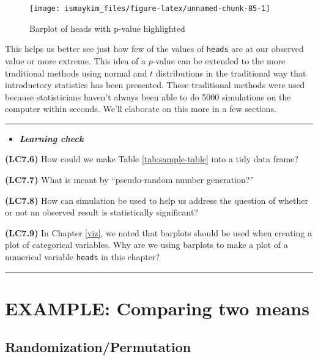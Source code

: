 \documentclass[]{tufte-book}
\let\oldrule=\rule
\renewcommand{\rule}[1]{\oldrule{\linewidth}}
\newenvironment{rmdblock}[1]
  {\begin{shaded*}
  \begin{itemize}
  \renewcommand{\labelitemi}{
    \raisebox{-.7\height}[0pt][0pt]{
    }
  }
  \item
  }
  {
  \end{itemize}
  \end{shaded*}
  }
\newenvironment{learncheck}
  {\begin{rmdblock}{warning}}
  {\end{rmdblock}}
\theoremstyle{definition}
\theoremstyle{definition}
\theoremstyle{remark}
\begin{document}
\begin{figure}

{\centering \texttt{[image: ismaykim\_files/figure-latex/unnamed-chunk-85-1]} 

}

\caption[Barplot of heads with p-value highlighted]{Barplot of heads with p-value highlighted}\label{fig:unnamed-chunk-85}
\end{figure}

This helps us better see just how few of the values of \texttt{heads}
are at our observed value or more extreme. This idea of a \(p\)-value
can be extended to the more traditional methods using normal and \(t\)
distributions in the traditional way that introductory statistics has
been presented. These traditional methods were used because
statisticians haven't always been able to do 5000 simulations on the
computer within seconds. We'll elaborate on this more in a few sections.

\begin{center}\rule{0.5\linewidth}{\linethickness}\end{center}

\begin{learncheck}
\textbf{\emph{Learning check}}
\end{learncheck}

\textbf{(LC7.6)} How could we make Table \ref{tab:sample-table} into a
tidy data frame?

\textbf{(LC7.7)} What is meant by ``pseudo-random number generation?''

\textbf{(LC7.8)} How can simulation be used to help us address the
question of whether or not an observed result is statistically
significant?

\textbf{(LC7.9)} In Chapter \ref{viz}, we noted that barplots should be
used when creating a plot of categorical variables. Why are we using
barplots to make a plot of a numerical variable \texttt{heads} in this
chapter?

\begin{center}\rule{0.5\linewidth}{\linethickness}\end{center}

\section{EXAMPLE: Comparing two
means}\label{example-comparing-two-means}

\subsection{Randomization/Permutation}\label{randomizationpermutation}
\end{document}
